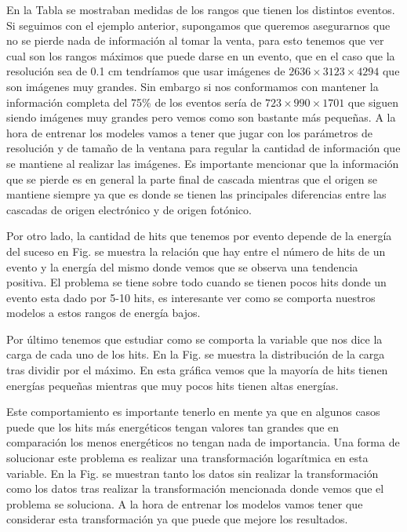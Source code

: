 \documentclass[a4paper,12pt,twoside,titlepage]{article}
\begin{document}
En la Tabla se mostraban medidas de los rangos que tienen los distintos eventos. Si seguimos con el ejemplo anterior, supongamos que queremos asegurarnos que no se pierde nada de información al tomar la venta, para esto tenemos que ver cual son los rangos máximos que puede darse en un evento, que en el caso que la resolución sea de 0.1 cm tendríamos que usar imágenes de $2636\times 3123\times 4294$ que son imágenes muy grandes. Sin embargo si nos conformamos con mantener la información completa del 75\% de los eventos sería de $723\times 990\times 1701$ que siguen siendo imágenes muy grandes pero vemos como son bastante más pequeñas. A la hora de entrenar los modeles vamos a tener que jugar con los parámetros de resolución y de tamaño de la ventana para regular la cantidad de información que se mantiene al realizar las imágenes. Es importante mencionar que la información que se pierde es en general la parte final de cascada mientras que el origen se mantiene siempre ya que es donde se tienen las principales diferencias entre las cascadas de origen electrónico y de origen fotónico. 

Por otro lado, la cantidad de hits que tenemos por evento depende de la energía del suceso en Fig. se muestra la relación que hay entre el número de hits de un evento y la energía del mismo donde vemos que se observa una tendencia positiva. El problema se tiene sobre todo cuando se tienen pocos hits donde un evento esta dado por 5-10 hits, es interesante ver como se comporta nuestros modelos a estos rangos de energía bajos.

Por último tenemos que estudiar como se comporta la variable que nos dice la carga de cada uno de los hits. En la Fig. se muestra la distribución de la carga tras dividir por el máximo. En esta gráfica vemos que la mayoría de hits tienen energías pequeñas mientras que muy pocos hits tienen altas energías.

Este comportamiento es importante tenerlo en mente ya que en algunos casos puede que los hits más energéticos tengan valores tan grandes que en comparación los menos energéticos no tengan nada de importancia. Una forma de solucionar este problema es realizar una transformación logarítmica en esta variable. En la Fig. se muestran tanto los datos sin realizar la transformación como los datos tras realizar la transformación mencionada donde vemos que el problema se soluciona. A la hora de entrenar los modelos vamos tener que considerar esta transformación ya que puede que mejore los resultados.
\end{document}
